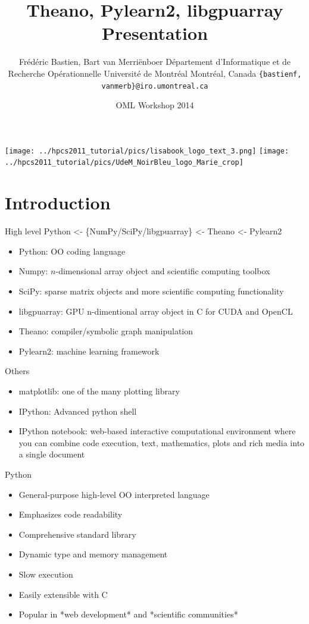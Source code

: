 \documentclass[utf8x,xcolor=pdftex,dvipsnames,table]{beamer}
\title{Theano, Pylearn2, libgpuarray Presentation}
\author{%
\footnotesize
Frédéric Bastien, Bart van Merriënboer \newline
Département d'Informatique et de Recherche Opérationnelle \newline
Université de Montréal \newline
Montréal, Canada \newline
\texttt{\{bastienf, vanmerb\}@iro.umontreal.ca} \newline \newline
}
\date{OML Workshop 2014}
\begin{document}
\begin{frame}[plain]
 \titlepage
 \vspace{-5em}
 \texttt{[image: ../hpcs2011\_tutorial/pics/lisabook\_logo\_text\_3.png]}
 \hfill
 \texttt{[image: ../hpcs2011\_tutorial/pics/UdeM\_NoirBleu\_logo\_Marie\_crop]}
\end{frame}

\section{Introduction}
\begin{frame}{High level}\setcounter{page}{1}
  Python <- \{NumPy/SciPy/libgpuarray\} <- Theano <- Pylearn2
  \begin{itemize}
  \item Python: OO coding language
  \item Numpy: $n$-dimensional array object and scientific computing toolbox
  \item SciPy: sparse matrix objects and more scientific computing functionality
  \item libgpuarray: GPU n-dimentional array object in C for CUDA and OpenCL
  \item Theano: compiler/symbolic graph manipulation
  \item Pylearn2: machine learning framework
  \end{itemize}
\end{frame}


\begin{frame}{Others}\setcounter{page}{1}
  \begin{itemize}
  \item matplotlib: one of the many plotting library
  \item IPython: Advanced python shell
  \item IPython notebook: web-based interactive computational environment where you can combine code execution, text, mathematics, plots and rich media into a single document
  \end{itemize}
\end{frame}

\begin{frame}{Python}
  \begin{itemize}
  \item General-purpose high-level OO interpreted language
  \item Emphasizes code readability
  \item Comprehensive standard library
  \item Dynamic type and memory management
  \item Slow execution
  \item Easily extensible with C
  \item Popular in *web development* and *scientific communities*
  \end{itemize}
\end{frame}
\end{document}
